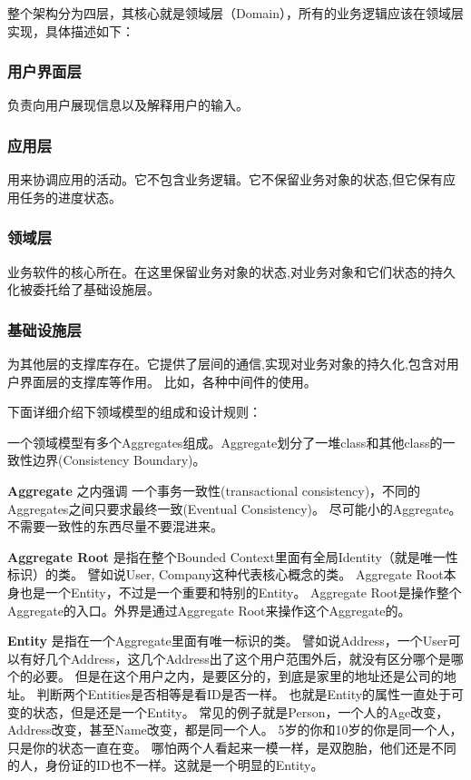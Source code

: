 \documentclass[journal]{IEEEtran}
\begin{document}
\begin{CJK*}{UTF8}{gbsn}
整个架构分为四层，其核心就是领域层（Domain），所有的业务逻辑应该在领域层实现，具体描述如下：
 
\subsubsection{用户界面层}
	负责向用户展现信息以及解释用户的输入。
\subsubsection{应用层}
  用来协调应用的活动。它不包含业务逻辑。它不保留业务对象的状态,但它保有应用任务的进度状态。
\subsubsection{领域层}
业务软件的核心所在。在这里保留业务对象的状态,对业务对象和它们状态的持久化被委托给了基础设施层。 


\subsubsection{基础设施层}
   为其他层的支撑库存在。它提供了层间的通信,实现对业务对象的持久化,包含对用户界面层的支撑库等作用。
   比如，各种中间件的使用。

 

下面详细介绍下领域模型的组成和设计规则：

 

一个领域模型有多个Aggregates组成。Aggregate划分了一堆class和其他class的一致性边界(Consistency Boundary)。

 

{\bfseries Aggregate}  之内强调 一个事务一致性(transactional consistency)，不同的Aggregates之间只要求最终一致(Eventual Consistency)。
  尽可能小的Aggregate。不需要一致性的东西尽量不要混进来。
  
 


{\bfseries Aggregate Root} 
是指在整个Bounded Context里面有全局Identity（就是唯一性标识）的类。
譬如说User, Company这种代表核心概念的类。
Aggregate Root本身也是一个Entity，不过是一个重要和特别的Entity。
Aggregate Root是操作整个Aggregate的入口。外界是通过Aggregate Root来操作这个Aggregate的。

 

{\bfseries   Entity }是指在一个Aggregate里面有唯一标识的类。
譬如说Address，一个User可以有好几个Address，这几个Address出了这个用户范围外后，就没有区分哪个是哪个的必要。
但是在这个用户之内，是要区分的，到底是家里的地址还是公司的地址。
判断两个Entities是否相等是看ID是否一样。
也就是Entity的属性一直处于可变的状态，但是还是一个Entity。
常见的例子就是Person，一个人的Age改变，Address改变，甚至Name改变，都是同一个人。
5岁的你和10岁的你是同一个人，只是你的状态一直在变。
哪怕两个人看起来一模一样，是双胞胎，他们还是不同的人，身份证的ID也不一样。这就是一个明显的Entity。
   

\end{CJK*}
\end{document}
